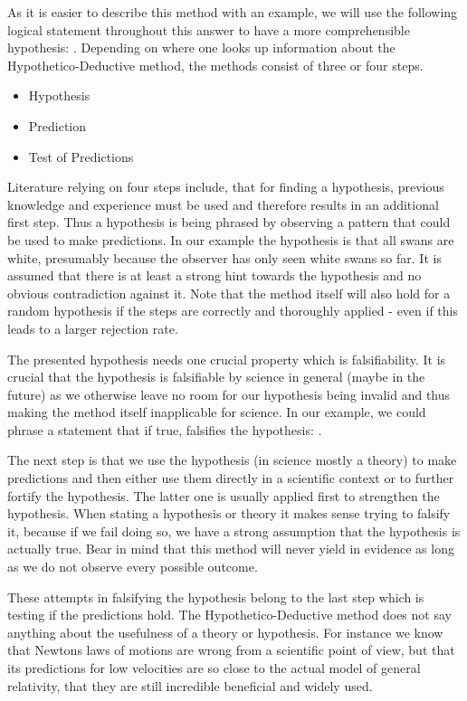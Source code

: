 \documentclass[11pt]{scrartcl}
\begin{document}
As it is easier to describe this method with an example, we will use the following logical statement throughout this answer to have a more comprehensible hypothesis: . 
Depending on where one looks up information about the Hypothetico-Deductive method, the methods consist of three or four steps.

\begin{itemize}
  \item Hypothesis
  \item Prediction
  \item Test of Predictions
\end{itemize}

Literature relying on four steps include, that for finding a hypothesis, previous knowledge and experience must be used and therefore results in an additional first step. Thus a hypothesis is being phrased by observing a pattern that could be used to make predictions. In our example the hypothesis is that all swans are white, presumably because the observer has only seen white swans so far. It is assumed that there is at least a strong hint towards the hypothesis and no obvious contradiction against it. Note that the method itself will also hold for a random hypothesis if the steps are correctly and thoroughly applied - even if this leads to a larger rejection rate.

The presented hypothesis needs one crucial property which is falsifiability. It is crucial that the hypothesis is falsifiable by science in general (maybe in the future) as we otherwise leave no room for our hypothesis being invalid and thus making the method itself inapplicable for science. In our example, we could phrase a statement that if true, falsifies the hypothesis: .

The next step is that we use the hypothesis (in science mostly a theory) to make predictions and then either use them directly in a scientific context or to further fortify the hypothesis. The latter one is usually applied first to strengthen the hypothesis. When stating a hypothesis or theory it makes sense trying to falsify it, because if we fail doing so, we have a strong assumption that the hypothesis is actually true. Bear in mind that this method will never yield in evidence as long as we do not observe every possible outcome.

These attempts in falsifying the hypothesis belong to the last step which is testing if the predictions hold. The Hypothetico-Deductive method does not say anything about the usefulness of a theory or hypothesis. For instance we know that Newtons laws of motions are wrong from a scientific point of view, but that its predictions for low velocities are so close to the actual model of general relativity, that they are still incredible beneficial and widely used.
\end{document}
